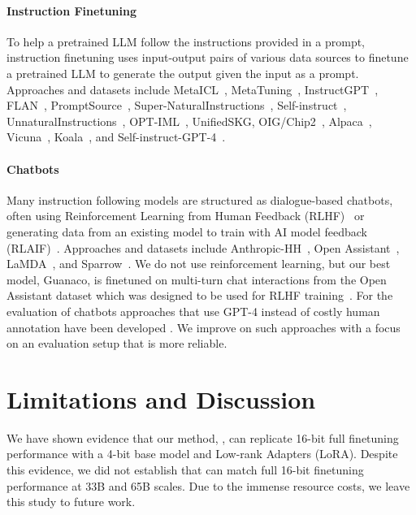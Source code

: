 \paragraph{Instruction Finetuning} To help a pretrained LLM follow the instructions provided in a prompt, instruction finetuning uses input-output pairs of various data sources to finetune a pretrained LLM to generate the output given the input as a prompt. Approaches and datasets include MetaICL~\citep{min2021metaicl}, MetaTuning~\citep{zhong2021adapting}, InstructGPT~\citep{ouyang2022training}, FLAN~\citep{wei2021finetuned,chung2022scaling}, PromptSource~\citep{bach2022promptsource}, Super-NaturalInstructions~\citep{wang2022super,sanh2021multitask}, Self-instruct~\citep{wang2022self}, UnnaturalInstructions~\citep{honovich2022unnatural}, OPT-IML~\citep{iyer2022opt}, UnifiedSKG\citep{xie2022unifiedskg}, OIG/Chip2~\citep{laion2023}, Alpaca~\citep{alpaca}, Vicuna~\citep{vicuna2023}, Koala~\citep{koala_blogpost_2023}, and Self-instruct-GPT-4~\citep{peng2023instruction}.

\paragraph{Chatbots} Many instruction following models are structured as dialogue-based chatbots, often using Reinforcement Learning from Human Feedback (RLHF)~\citep{christiano2017deep} or generating data from an existing model to train with AI model feedback (RLAIF)~\citep{bai2022constitutional}. Approaches and datasets include Anthropic-HH~\citep{askell2021general,bai2022training}, Open Assistant~\citep{kopf2023openassistant}, LaMDA~\citep{thoppilan2022lamda}, and Sparrow~\citep{glaese2022improving}. 
We do not use reinforcement learning, but our best model, Guanaco, is finetuned on multi-turn chat interactions from the Open Assistant dataset which was designed to be used for RLHF training~\citep{kopf2023openassistant}. For the evaluation of chatbots approaches that use GPT-4 instead of costly human annotation have been developed \citep{vicuna2023,peng2023instruction}. We improve on such approaches with a focus on an evaluation setup that is more reliable.

\section{Limitations and Discussion}

We have shown evidence that our method, \method, can replicate 16-bit full finetuning performance with a 4-bit base model and Low-rank Adapters (LoRA). Despite this evidence, we did not establish that \method can match full 16-bit finetuning performance at 33B and 65B scales. Due to the immense resource costs, we leave this study to future work. 

